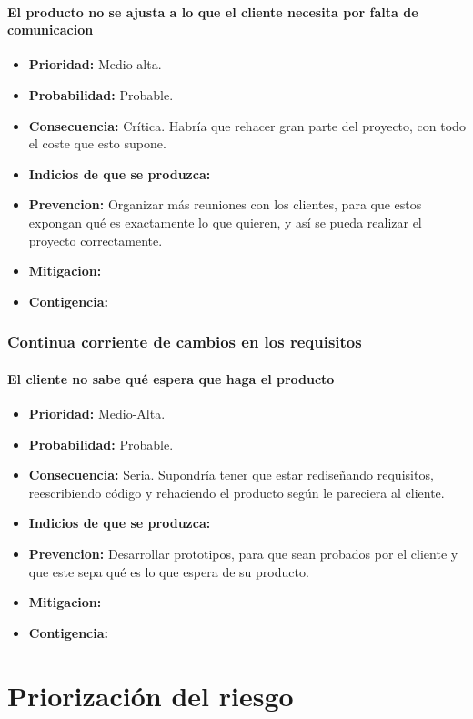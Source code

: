 \documentclass[spanish,a4paper,12pt]{report}	%
\begin{document}
\subsection*{El producto no se ajusta a lo que el cliente necesita por falta de comunicacion}			%
	\begin{itemize}
		\item \textbf {Prioridad: }Medio-alta.
		\item \textbf {Probabilidad: }Probable.
		\item \textbf {Consecuencia: }Crítica. Habría que rehacer gran parte del proyecto, con todo el coste que esto supone.
		\item \textbf {Indicios de que se produzca: }
		\item \textbf {Prevencion: }Organizar más reuniones con los clientes, para que estos expongan qué es exactamente lo que quieren, y así se pueda realizar el proyecto correctamente. 
		\item \textbf {Mitigacion: }
		\item \textbf {Contigencia: }
	\end{itemize}

%
\section{Continua corriente de cambios en los requisitos}
\subsection*{El cliente no sabe qué espera que haga el producto}		

	\begin{itemize}
		\item \textbf {Prioridad: }Medio-Alta.
		\item \textbf {Probabilidad: }Probable.
		\item \textbf {Consecuencia: }Seria. Supondría tener que estar rediseñando requisitos, reescribiendo código y rehaciendo el producto según le pareciera al cliente.
		\item \textbf {Indicios de que se produzca: }
		\item \textbf {Prevencion: }Desarrollar prototipos, para que sean probados por el cliente y que este sepa qué es lo que espera de su producto.
		\item \textbf {Mitigacion: }
		\item \textbf {Contigencia: }
	\end{itemize}


\newpage
\mbox{}
\thispagestyle{empty}						%
\newpage

\part{Priorización del riesgo}


\newpage
\mbox{}
\thispagestyle{empty}						%
\newpage
\end{document}
